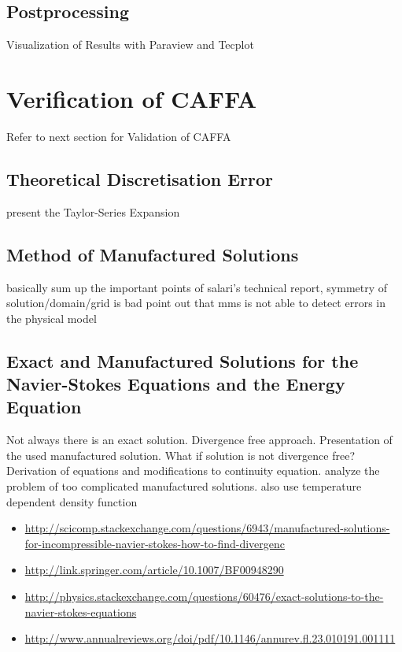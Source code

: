 \documentclass[article,type=msc,colorback,accentcolor=tud2a]{tudthesis}
\begin{document}
    \subsection{Postprocessing}
    
      Visualization of Results with Paraview and Tecplot

  \section{Verification of CAFFA}
    
    Refer to next section for Validation of CAFFA

    \subsection{Theoretical Discretisation Error}
      present the Taylor-Series Expansion
    \subsection{Method of Manufactured Solutions}
      basically sum up the important points of salari's technical report, symmetry of solution/domain/grid is bad
      point out that mms is not able to detect errors in the physical model

    \subsection{Exact and Manufactured Solutions for the Navier-Stokes Equations and the Energy Equation}
    Not always there is an exact solution. Divergence free approach. Presentation of the used manufactured solution. What if solution is not divergence free? Derivation of equations and modifications to continuity equation. analyze the problem of too complicated manufactured solutions. also use temperature dependent density function
    \begin{itemize}
      \item \url{http://scicomp.stackexchange.com/questions/6943/manufactured-solutions-for-incompressible-navier-stokes-how-to-find-divergenc}
      \item \url{http://link.springer.com/article/10.1007/BF00948290}
      \item \url{http://physics.stackexchange.com/questions/60476/exact-solutions-to-the-navier-stokes-equations}
      \item \url{http://www.annualreviews.org/doi/pdf/10.1146/annurev.fl.23.010191.001111}
    \end{itemize}
\end{document}
